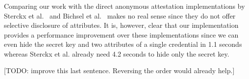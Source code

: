 Comparing our work with the direct anonymous attestation implementations by
Sterckx et al.~\cite{Sterckx09} and Bichsel et al.~\cite{BichselCGS2009} makes
no real sense since they do not offer selective disclosure of attributes. It is,
however, clear that our implementation provides a performance improvement over
these implementations since we can even hide the secret key and two attributes
of a single credential in 1.1 seconds whereas Sterckx et al. already need 4.2
seconds to hide only the secret key.

[TODO: improve this last sentence. Reversing the order would already help.]

